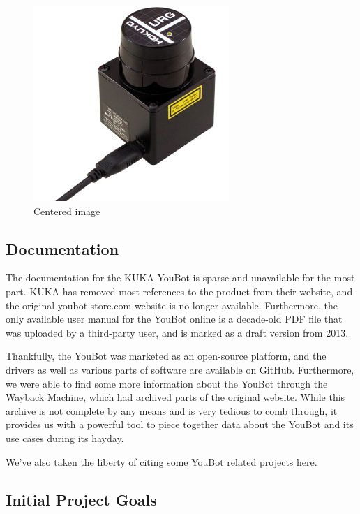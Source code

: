 \documentclass[a4paper, 12pt]{article}
\newif\ifshownotes
\newcommand{\notes}[1]{\ifshownotes\textcolor{blue}{#1}\fi}
\begin{document}
    \begin{figure}[ht]
        \centering
        \includegraphics[width=0.5\linewidth]{images/sec2/hokuyo.png}
        \caption{Centered image}
    \end{figure}

    \subsection{Documentation}

    The documentation for the KUKA YouBot is sparse and unavailable for the most part. KUKA has removed most references to the product from their website, and the original youbot-store.com website is no longer available. Furthermore, the only available user manual for the YouBot online is a decade-old PDF file that was uploaded by a third-party user, and is marked as a draft version from 2013. 

    Thankfully, the YouBot was marketed as an open-source platform, and the drivers as well as various parts of software are available on GitHub. Furthermore, we were able to find some more information about the YouBot through the Wayback Machine, which had archived parts of the original website. While this archive is not complete by any means and is very tedious to comb through, it provides us with a powerful tool to piece together data about the YouBot and its use cases during its hayday.

    We've also taken the liberty of citing some YouBot related projects here.

    \notes{add images of some of the more interesting websites here, and some of the images regarding the youbot's statistics.}
    \subsection{Initial Project Goals}
\end{document}
